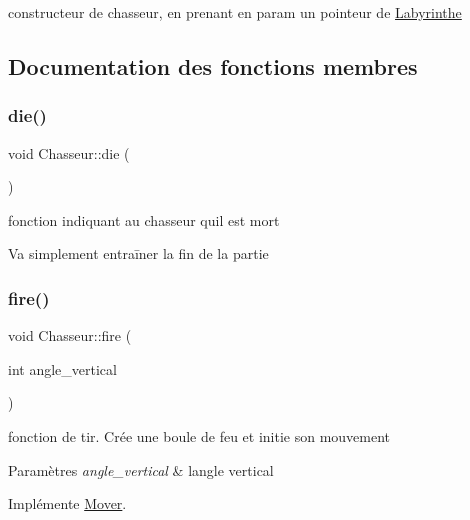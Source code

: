 constructeur de chasseur, en prenant en param un pointeur de \hyperlink{classLabyrinthe}{Labyrinthe} 



\subsection{Documentation des fonctions membres}
\mbox{\label{classChasseur_ad618f782898a99810dae7ad8ee2c2f74}} 
\subsubsection{\texorpdfstring{die()}{die()}}
{\footnotesize\ttfamily void Chasseur\+::die (\begin{DoxyParamCaption}{ }\end{DoxyParamCaption})\hspace{0.3cm}{\ttfamily [private]}}



fonction indiquant au chasseur qu\textquotesingle{}il est mort 

Va simplement entraīner la fin de la partie \mbox{\label{classChasseur_ae4610a58bb02ee492e8bdfbee917db8a}} 
\subsubsection{\texorpdfstring{fire()}{fire()}}
{\footnotesize\ttfamily void Chasseur\+::fire (\begin{DoxyParamCaption}\item[{int}]{angle\+\_\+vertical }\end{DoxyParamCaption})\hspace{0.3cm}{\ttfamily [virtual]}}



fonction de tir. Crée une boule de feu et initie son mouvement 


\begin{DoxyParams}{Paramètres}
{\em angle\+\_\+vertical} & l\textquotesingle{}angle vertical \\
\hline
\end{DoxyParams}


Implémente \hyperlink{classMover_a670fb72f8e496de3420b89c84def7418}{Mover}.

